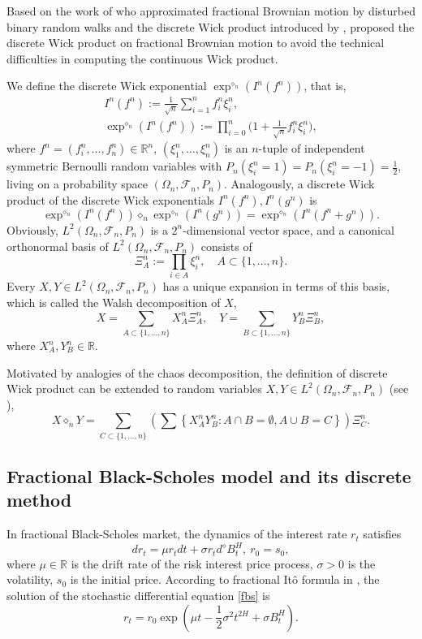 \documentclass[reqno]{amsart}
\begin{document}
Based on the work of \cite{sottinen2001fractional} who approximated fractional 
Brownian motion by disturbed binary random walks and the discrete Wick product 
introduced by \cite{holden1992discrete}, \cite{bender2004arbitrage} proposed the 
discrete Wick product on fractional Brownian motion to avoid the technical difficulties 
in computing the continuous Wick product.

We define the discrete Wick exponential 
$\exp ^{\diamond_n}\left(I^n\left(f^n\right)\right)$, that is,
\begin{gather*}
 I^n\left(f^n\right):=\frac{1}{\sqrt{n}} \sum_{i=1}^n f_i^n \xi_i^n, \\
 \exp ^{\diamond_n}\left(I^n\left(f^n\right)\right)
 :=\prod_{i=0}^n\Big(1+\frac{1}{\sqrt{n}} f_i^n \xi_i^n\Big) ,
\end{gather*}
where
$f^n=\left(f_i^n, \dots, f_n^n\right) \in \mathbb{R}^n$,
$\left(\xi_1^n, \dots, \xi_n^n\right)$ is an $n$-tuple of independent symmetric
Bernoulli random variables with 
$P_n\left(\xi_i^n=1\right)=P_n\left(\xi_i^n=-1\right)=\frac{1}{2}$, 
living on a probability space $\left(\Omega_n, \mathcal{F}_n, P_n\right)$.
Analogously, a discrete Wick product of the discrete Wick exponentials 
$I^n\left(f^n\right), I^n\left(g^n\right)$ is
\[
 \exp ^{\diamond_n}\left(I^n\left(f^n\right)\right) \diamond_n 
 \exp ^{\diamond_n}\left(I^n\left(g^n\right)\right)
 =\exp ^{\diamond_n}\left(I^n\left(f^n+g^n\right)\right) .
\]
Obviously, $L^2\left(\Omega_n, \mathcal{F}_n, P_n\right)$ is a $2^n$-dimensional 
vector space, and a canonical orthonormal basis of 
$L^2\left(\Omega_n, \mathcal{F}_n, P_n\right)$ consists of
\[
 \Xi_A^n:=\prod_{i \in A} \xi_i^n, \quad A \subset\{1, \dots, n\}.
\]
Every $X,Y \in L^2\left(\Omega_n, \mathcal{F}_n, P_n\right)$ has a unique expansion 
in terms of this basis, which is called the Walsh decomposition of $X$,
\[
 X=\sum_{A \subset\{1, \dots, n\}} X_A^n \Xi_A^n, \quad
 Y=\sum_{B \subset\{1, \dots, n\}} Y_B^n \Xi_B^n,
\]
where $X_A^n,Y_B^n \in \mathbb{R}$.

Motivated by analogies of the chaos decomposition, the definition of discrete 
Wick product can be extended to random variables 
$X, Y \in L^2\left(\Omega_n, \mathcal{F}_n, P_n\right)$ (see \cite{bender2012connection}),
\[
 X \diamond_n Y=\sum_{C \subset\{1, \dots, n\}}
 \left(\sum\left\{X_A^n Y_B^n: A \cap B=\emptyset, A \cup B=C\right\}\right) \Xi_C^n.
\]

\subsection{Fractional Black-Scholes model and its discrete method}
In fractional Black-Scholes market, the dynamics of the interest rate $r_t$ satisfies
\begin{equation}
\label{fbs}
 d r_t=\mu r_t d t+\sigma r_t d^{\diamond} B_t^H, \ r_0=s_0,
\end{equation}
where $\mu \in \mathbb{R}$ is the drift rate of the risk interest price process, $\sigma>0$ is the volatility, $s_0$ is the initial price. According to fractional It\^o formula in \cite[Theorem 4.3]{duncan2000stochastic}, the solution of the stochastic differential equation \eqref{fbs} is
\[
 r_t=r_0 \exp \left(\mu t-\frac{1}{2} \sigma^2 t^{2 H}+\sigma B_t^H\right).
\]
\end{document}
